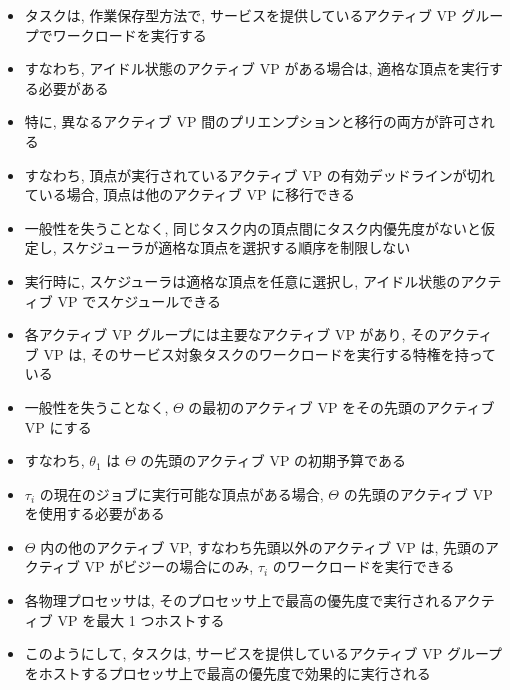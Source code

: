 \begin{frame}{}
    \begin{itemize}
        \item タスクは, 作業保存型方法で, サービスを提供しているアクティブ VP グループでワークロードを実行する
        \item すなわち, アイドル状態のアクティブ VP がある場合は, 適格な頂点を実行する必要がある
        \item 特に, 異なるアクティブ VP 間のプリエンプションと移行の両方が許可される
        \item すなわち, 頂点が実行されているアクティブ VP の有効デッドラインが切れている場合, 頂点は他のアクティブ VP に移行できる
        \item 一般性を失うことなく, 同じタスク内の頂点間にタスク内優先度がないと仮定し, スケジューラが適格な頂点を選択する順序を制限しない
        \item 実行時に, スケジューラは適格な頂点を任意に選択し, アイドル状態のアクティブ VP でスケジュールできる
    \end{itemize}
\end{frame}

\begin{frame}{}
    \begin{itemize}
        \item 各アクティブ VP グループには主要なアクティブ VP があり, そのアクティブ VP は, そのサービス対象タスクのワークロードを実行する特権を持っている
        \item 一般性を失うことなく, $\Theta$ の最初のアクティブ VP をその先頭のアクティブ VP にする
        \item すなわち, $\theta_{1}$ は $\Theta$ の先頭のアクティブ VP の初期予算である
        \item $\tau_{i}$ の現在のジョブに実行可能な頂点がある場合, $\Theta$ の先頭のアクティブ VP を使用する必要がある
        \item $\Theta$ 内の他のアクティブ VP, すなわち先頭以外のアクティブ VP は, 先頭のアクティブ VP がビジーの場合にのみ, $\tau_{i}$ のワークロードを実行できる
    \end{itemize}
\end{frame}

\begin{frame}{}
    \begin{itemize}
        \item 各物理プロセッサは, そのプロセッサ上で最高の優先度で実行されるアクティブ VP を最大 1 つホストする
        \item このようにして, タスクは, サービスを提供しているアクティブ VP グループをホストするプロセッサ上で最高の優先度で効果的に実行される
    \end{itemize}
\end{frame}


